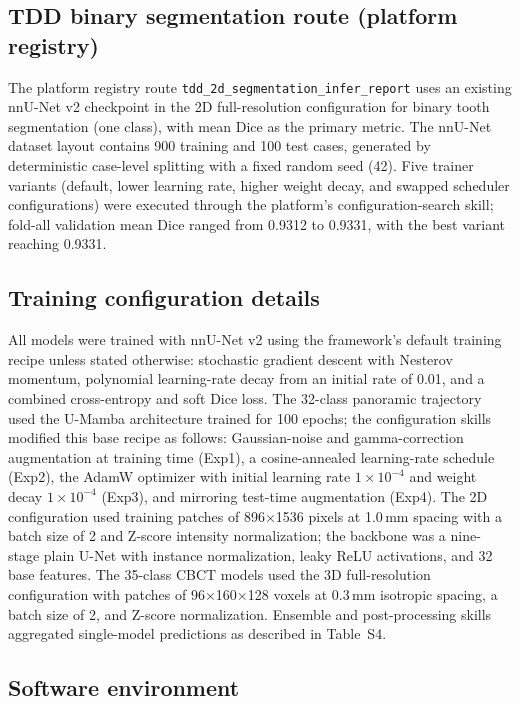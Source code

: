 \documentclass[11pt]{article}
\begin{document}
\subsection{TDD binary segmentation route (platform registry)}

The platform registry route \texttt{tdd\_2d\_segmentation\_infer\_report} uses an existing nnU-Net v2 checkpoint in the 2D full-resolution configuration for binary tooth segmentation (one class), with mean Dice as the primary metric. The nnU-Net dataset layout contains 900 training and 100 test cases, generated by deterministic case-level splitting with a fixed random seed (42). Five trainer variants (default, lower learning rate, higher weight decay, and swapped scheduler configurations) were executed through the platform's configuration-search skill; fold-all validation mean Dice ranged from 0.9312 to 0.9331, with the best variant reaching 0.9331.

\subsection{Training configuration details}

All models were trained with nnU-Net v2 using the framework's default training recipe unless stated otherwise: stochastic gradient descent with Nesterov momentum, polynomial learning-rate decay from an initial rate of 0.01, and a combined cross-entropy and soft Dice loss. The 32-class panoramic trajectory used the U-Mamba architecture trained for 100 epochs; the configuration skills modified this base recipe as follows: Gaussian-noise and gamma-correction augmentation at training time (Exp1), a cosine-annealed learning-rate schedule (Exp2), the AdamW optimizer with initial learning rate $1\times10^{-4}$ and weight decay $1\times10^{-4}$ (Exp3), and mirroring test-time augmentation (Exp4). The 2D configuration used training patches of 896$\times$1536 pixels at 1.0\,mm spacing with a batch size of 2 and Z-score intensity normalization; the backbone was a nine-stage plain U-Net with instance normalization, leaky ReLU activations, and 32 base features. The 35-class CBCT models used the 3D full-resolution configuration with patches of 96$\times$160$\times$128 voxels at 0.3\,mm isotropic spacing, a batch size of 2, and Z-score normalization. Ensemble and post-processing skills aggregated single-model predictions as described in Table~S4.

\subsection{Software environment}
\end{document}
